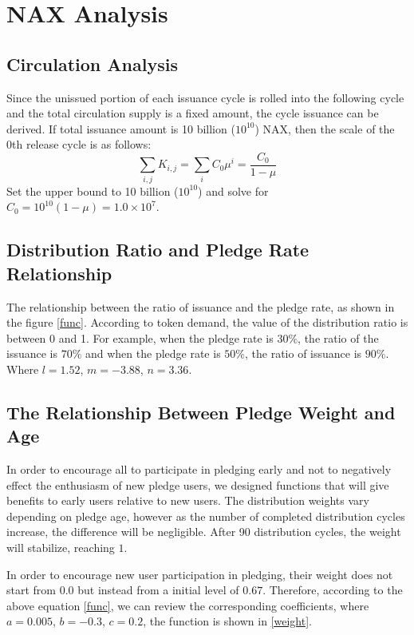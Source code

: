 \section{NAX Analysis}
\subsection{Circulation Analysis}
Since the unissued portion of each issuance cycle is rolled into the following cycle and the total circulation supply is a fixed amount, the cycle issuance can be derived. If total issuance amount is 10 billion (\(10^{10}\)) NAX, then the scale of the 0th release cycle is as follows:
\begin{equation}
  \sum_{i,j} K_{i,j} = \sum_i C_0 \mu^i = \frac{C_0}{1-\mu}
\end{equation}
  Set the upper bound to 10 billion (\(10^{10}\)) and solve for \(C_0 = 10^{10}(1-\mu) = 1.0\times10^7\).

\subsection{Distribution Ratio and Pledge Rate Relationship}
The relationship between the ratio of issuance and the pledge rate, as shown in the figure \ref{func}. According to token demand, the value of the distribution ratio is between 0 and 1. For example, when the pledge rate is $30\%$, the ratio of the issuance is $70\%$ and when the pledge rate is $50\%$, the ratio of issuance is $90\%$. Where \(l=1.52\), \(m=-3.88\), \(n=3.36\).

\subsection{The Relationship Between Pledge Weight and Age}
In order to encourage all to participate in pledging early and not to negatively effect the enthusiasm of new pledge users, we designed functions that will give benefits to early users relative to new users. The distribution weights vary depending on pledge age, however as the number of completed distribution cycles increase, the difference will be negligible. After 90 distribution cycles, the weight will stabilize, reaching $1$. 

In order to encourage new user participation in pledging, their weight does not start from 0.0 but instead from a initial level of $0.67$. Therefore, according to the above equation \ref{func}, we can review the corresponding coefficients, where \(a=0.005\), \(b=-0.3\), \(c=0.2\), the function is shown in \ref{weight}. 

